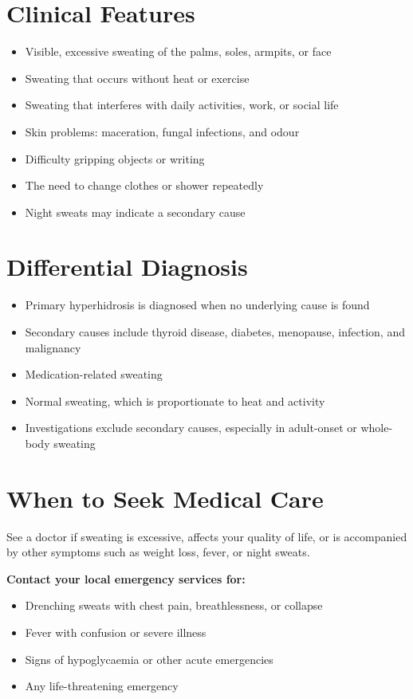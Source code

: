 \section*{Clinical Features}
\begin{itemize}
    \item Visible, excessive sweating of the palms, soles, armpits, or face
    \item Sweating that occurs without heat or exercise
    \item Sweating that interferes with daily activities, work, or social life
    \item Skin problems: maceration, fungal infections, and odour
    \item Difficulty gripping objects or writing
    \item The need to change clothes or shower repeatedly
    \item Night sweats may indicate a secondary cause
\end{itemize}

\section*{Differential Diagnosis}
\begin{itemize}
    \item Primary hyperhidrosis is diagnosed when no underlying cause is found
    \item Secondary causes include thyroid disease, diabetes, menopause, infection, and malignancy
    \item Medication-related sweating
    \item Normal sweating, which is proportionate to heat and activity
    \item Investigations exclude secondary causes, especially in adult-onset or whole-body sweating
\end{itemize}

\section*{When to Seek Medical Care}
See a doctor if sweating is excessive, affects your quality of life, or is accompanied by other symptoms such as weight loss, fever, or night sweats.

\textbf{Contact your local emergency services for:}
\begin{itemize}
    \item Drenching sweats with chest pain, breathlessness, or collapse
    \item Fever with confusion or severe illness
    \item Signs of hypoglycaemia or other acute emergencies
    \item Any life-threatening emergency
\end{itemize}

